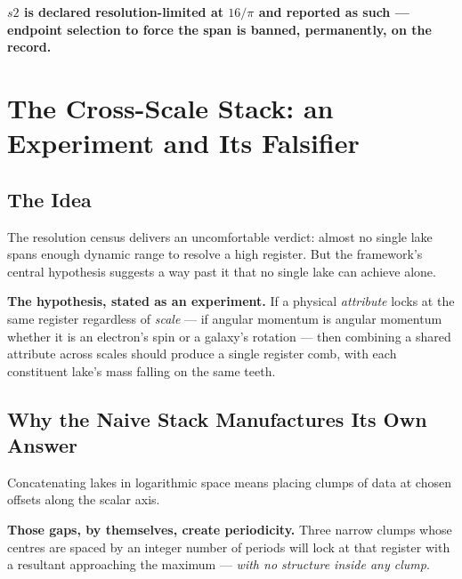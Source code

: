 \documentclass[11pt, letterpaper, openany]{book}
\begin{document}
\begin{rulingbox}
\textbf{$s2$ is declared resolution-limited at $16/\pi$ and reported as such --- endpoint selection
to force the span is banned, permanently, on the record.} 
\end{rulingbox}

\chapter{The Cross-Scale Stack: an Experiment and Its Falsifier}

\section{The Idea}

The resolution census delivers an uncomfortable verdict: almost no single lake spans
enough dynamic range to resolve a high register. But the framework's central hypothesis suggests a
way past it that no single lake can achieve alone.

\begin{signalbox}
\textbf{The hypothesis, stated as an experiment.} If a physical \emph{attribute} locks at the same
register regardless of \emph{scale} --- if angular momentum is angular momentum whether it is an
electron's spin or a galaxy's rotation --- then combining a shared attribute across scales should
produce a single register comb, with each constituent lake's mass falling on the same teeth.
\end{signalbox}

\section{Why the Naive Stack Manufactures Its Own Answer}

Concatenating lakes in logarithmic space means placing clumps of data at chosen offsets along the
scalar axis. 

\begin{formbox}
\textbf{Those gaps, by themselves, create periodicity.} Three narrow clumps whose centres are
spaced by an integer number of periods will lock at that register with a resultant approaching the
maximum --- \emph{with no structure inside any clump}. 
\end{formbox}
\end{document}
